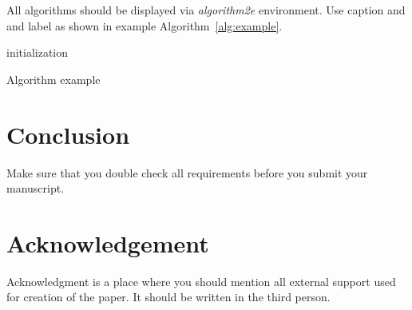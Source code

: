 \documentclass{pjtemplate}
\begin{document}
\noindent
All algorithms should be displayed via \emph{algorithm2e} environment. Use caption and and label as shown in example Algorithm~\ref{alg:example}.

\begin{algorithm}[H]
\SetAlgoLined
{}
 initialization\;
 \caption{Algorithm example}\label{alg:example}
\end{algorithm}




\section{Conclusion}

Make sure that you double check all requirements before you submit your manuscript.


\section*{Acknowledgement}

Acknowledgment is a place where you should mention all external support used for creation of the paper. It should be written in the third person.




\end{document}
